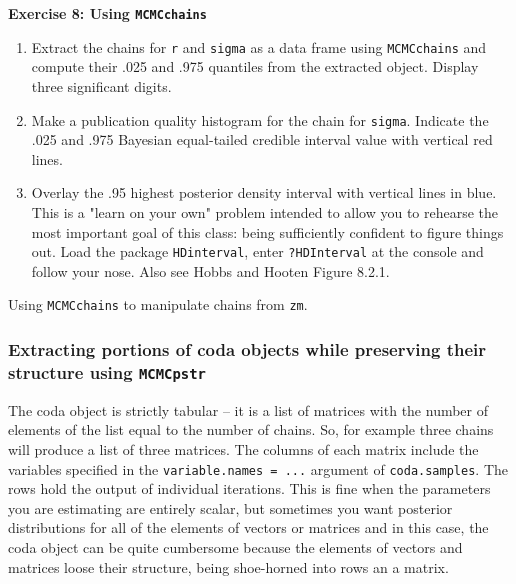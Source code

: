 \documentclass[12pt,english]{article}
\begin{document}
\bigskip
\belowcaptionskip=-20pt
\begin{exercise}
\begin{mdframed}
\doublespacing
\textbf{Exercise 8: Using \texttt{MCMCchains}} 
\begin{enumerate}
\item Extract the chains for \texttt{r} and \texttt{sigma} as a data frame using \texttt{MCMCchains} and compute their .025 and .975 quantiles from the extracted object.  Display three significant digits.
\item Make a publication quality histogram for the chain for \texttt{sigma}. Indicate the .025 and .975 Bayesian equal-tailed credible interval value with  vertical red lines.
\item Overlay the .95 highest posterior density interval with vertical lines in blue. This is a "learn on your own" problem intended to allow you to rehearse the most important goal of this class: being sufficiently confident to figure things out.  Load the package \texttt{HDinterval}, enter \texttt{?HDInterval} at the console and follow your nose. Also see Hobbs and Hooten Figure 8.2.1.  
\end{enumerate}
\end{mdframed}
\captionsetup{textformat=empty, labelformat=empty}
\caption[Using \texttt{MCMCchains} to manipulate chains from \texttt{zm}]{Using \texttt{MCMCchains} to manipulate chains from \texttt{zm}.}
\label{ex:MCMCchains}
\end{exercise}
\belowcaptionskip=0pt

\subsubsection{Extracting portions of coda objects while preserving their structure using  \texttt{MCMCpstr}}

The coda object is strictly tabular -- it is a list of matrices with the number of elements of the list equal to the number of chains. So, for example three chains will produce a list of three matrices.  The columns of  each matrix include the variables specified in the \texttt{variable.names = ...} argument of \texttt{coda.samples}. The rows hold the output of individual iterations. This is fine when the parameters you are estimating are entirely scalar, but sometimes you want posterior distributions for all of the elements of vectors or matrices and in this case, the coda object can be quite cumbersome because the elements of vectors and matrices loose their structure, being shoe-horned into rows an a matrix.
\end{document}
